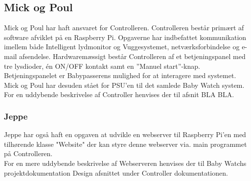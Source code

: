 \subsection*{Mick og Poul}
Mick og Poul har haft ansvaret for Controlleren. Controlleren består primært af software afviklet på en Raspberry Pi. Opgaverne har indbefattet kommunikation imellem både Intelligent lydmonitor og Vuggesystemet, netværksforbindelse og e-mail afsendelse. 
Hardwaremæssigt består Controlleren af et betjeningspanel med tre lysdioder, én ON/OFF kontakt samt en ''Manuel start''-knap. Betjeningspanelet er Babypasserens mulighed for at interagere med systemet.
Mick og Poul har desuden stået for PSU'en til det samlede Baby Watch system. \\
For en uddybende beskrivelse af Controller henvises der til afsnit BLA BLA.

\subsubsection*{Jeppe}
Jeppe har også haft en opgaven at udvikle en webserver til Raspberry Pi'en med tilhørende klasse "Website" der kan styre denne webserver via. main programmet på Controlleren. \\
For en mere uddybende beskrivelse af Webserveren henvises der til Baby Watchs projektdokumentation Design afsnittet under Controller dokumentationen.